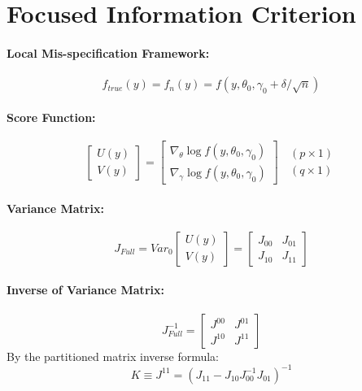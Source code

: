 \documentclass[12pt]{article}
\theoremstyle{definition}
\begin{document}
\section{Focused Information Criterion}


\paragraph{Local Mis-specification Framework:}
	$$f_{true}(y)=f_n(y)=f(y, \theta_0, \gamma_0 + \delta/\sqrt{n})$$

\paragraph{Score Function:}
	$$\left[\begin{array}{c}
		U(y)\\
		V(y)
\end{array} \right] = \left[\begin{array}{c}
		\nabla_\theta \log{f(y, \theta_0, \gamma_0)}\\
		\nabla_\gamma \log{f(y, \theta_0, \gamma_0)}
\end{array}\right]\;\;\begin{array}{c}
		(p\times 1)\\
		(q\times 1)
\end{array}$$

\paragraph{Variance Matrix:}
	$$J_{Full} = Var_0\left[\begin{array}{c}
		U(y)\\
		V(y)
\end{array}\right]=\left[\begin{array}{cc}
		J_{00} & J_{01}\\
		J_{10} & J_{11}
	\end{array}\right]
$$
\paragraph{Inverse of Variance Matrix:}
	$$
	J_{Full}^{-1} = \left[\begin{array}{cc}
		J^{00} & J^{01}\\
		J^{10} & J^{11}
	\end{array}\right]
$$
By the partitioned matrix inverse formula:
	$$
	K \equiv J^{11} = (J_{11} - J_{10}J_{00}^{-1}J_{01})^{-1}
$$
\end{document}
